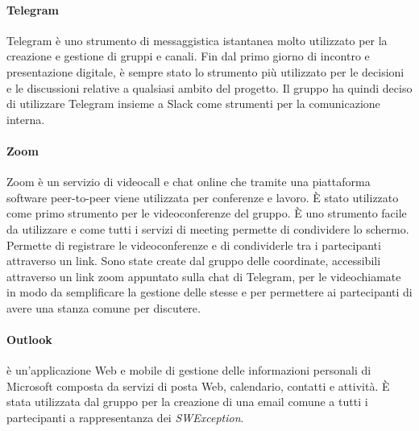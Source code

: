 \paragraph{Telegram}
Telegram è uno strumento di messaggistica istantanea molto utilizzato per la creazione e gestione di gruppi e canali. Fin dal primo giorno di incontro e presentazione digitale, è sempre stato lo strumento più utilizzato per le decisioni e le discussioni relative a qualsiasi ambito del progetto. Il gruppo ha quindi deciso di utilizzare Telegram insieme a Slack come strumenti per la comunicazione interna.

\paragraph{Zoom}
Zoom è un servizio di videocall e chat online che tramite una piattaforma software peer-to-peer viene utilizzata per conferenze e lavoro. È stato utilizzato come primo strumento per le videoconferenze del gruppo. È uno strumento facile da utilizzare e come tutti i servizi di meeting permette di condividere lo schermo. Permette di registrare le videoconferenze e di condividerle tra i partecipanti attraverso un link. Sono state create dal gruppo delle coordinate, accessibili attraverso un link zoom appuntato sulla chat di Telegram, per le videochiamate in modo da semplificare la gestione delle stesse e per permettere ai partecipanti di avere una stanza comune per discutere.

\paragraph{Outlook}
 è un'applicazione Web e mobile di gestione delle informazioni personali di Microsoft composta da servizi di posta Web, calendario, contatti e attività. È stata utilizzata dal gruppo per la creazione di una email comune a tutti i partecipanti a rappresentanza dei \textit{SWException}.

